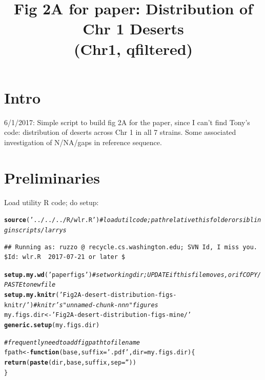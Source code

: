 \documentclass{article}\usepackage[]{graphicx}\usepackage[]{color}
\makeatletter
\newcommand{\hlstr}[1]{\textcolor[rgb]{0.192,0.494,0.8}{#1}}%
\newcommand{\hlcom}[1]{\textcolor[rgb]{0.678,0.584,0.686}{\textit{#1}}}%
\newcommand{\hlstd}[1]{\textcolor[rgb]{0.345,0.345,0.345}{#1}}%
\newcommand{\hlkwa}[1]{\textcolor[rgb]{0.161,0.373,0.58}{\textbf{#1}}}%
\newcommand{\hlkwb}[1]{\textcolor[rgb]{0.69,0.353,0.396}{#1}}%
\newcommand{\hlkwc}[1]{\textcolor[rgb]{0.333,0.667,0.333}{#1}}%
\newcommand{\hlkwd}[1]{\textcolor[rgb]{0.737,0.353,0.396}{\textbf{#1}}}%
\newenvironment{kframe}{%
 \def\at@end@of@kframe{}%
 \ifinner\ifhmode%
  \def\at@end@of@kframe{\end{minipage}}%
  \begin{minipage}{\columnwidth}%
 \fi\fi%
 \def\FrameCommand##1{\hskip\@totalleftmargin \hskip-\fboxsep
 \colorbox{shadecolor}{##1}\hskip-\fboxsep
     \hskip-\linewidth \hskip-\@totalleftmargin \hskip\columnwidth}%
 \MakeFramed {\advance\hsize-\width
   \@totalleftmargin\z@ \linewidth\hsize
   \@setminipage}}%
 {\par\unskip\endMakeFramed%
 \at@end@of@kframe}
\newenvironment{knitrout}{}{} %
\makeatother
\begin{document}
\title{Fig 2A for paper: Distribution of Chr 1 Deserts\\\large(Chr1, qfiltered)}
\maketitle

\tableofcontents

\section{Intro}
6/1/2017: Simple  script to build fig 2A for the paper, since I can't find Tony's code: distribution of deserts across Chr 1 in all 7 strains.  Some associated investigation of N/NA/gaps in reference sequence.

\section{Preliminaries}
Load utility R code; do setup:

\begin{knitrout}\footnotesize
{}\color{fgcolor}\begin{kframe}
\begin{alltt}
\hlkwd{source}\hlstd{(}\hlstr{'../../../R/wlr.R'}\hlstd{)} \hlcom{# load util code; path relative this folder or sibling in scripts/larrys }
\end{alltt}
\begin{verbatim}
## Running as: ruzzo @ recycle.cs.washington.edu; SVN Id, I miss you.  $Id: wlr.R  2017-07-21 or later $
\end{verbatim}
\begin{alltt}
\hlkwd{setup.my.wd}\hlstd{(}\hlstr{'paperfigs'}\hlstd{)} \hlcom{# set working dir; UPDATE if this file moves, or if COPY/PASTE to new file}
\hlkwd{setup.my.knitr}\hlstd{(}\hlstr{'Fig2A-desert-distribution-figs-knitr/'}\hlstd{)} \hlcom{# knitr's "unnamed-chunk-nnn" figures}
\hlstd{my.figs.dir} \hlkwb{<-} \hlstr{'Fig2A-desert-distribution-figs-mine/'}
\hlkwd{generic.setup}\hlstd{(my.figs.dir)}
\end{alltt}
\end{kframe}
\end{knitrout}
\begin{knitrout}\footnotesize
{}\color{fgcolor}\begin{kframe}
\begin{alltt}
\hlcom{# frequently need to add figpath to file name}
\hlstd{fpath} \hlkwb{<-} \hlkwa{function}\hlstd{(}\hlkwc{base}\hlstd{,} \hlkwc{suffix}\hlstd{=}\hlstr{'.pdf'}\hlstd{,} \hlkwc{dir}\hlstd{=my.figs.dir)\{}
  \hlkwd{return}\hlstd{(}\hlkwd{paste}\hlstd{(dir, base, suffix,} \hlkwc{sep}\hlstd{=}\hlstr{''}\hlstd{))}
\hlstd{\}}
\end{alltt}
\end{kframe}
\end{knitrout}
\end{document}
